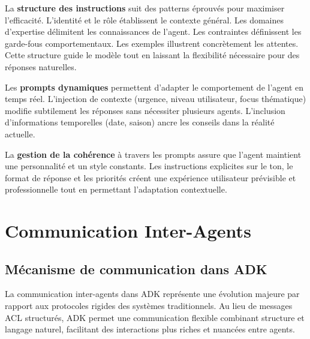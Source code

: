 La \textbf{structure des instructions} suit des patterns éprouvés pour maximiser l'efficacité. L'identité et le rôle établissent le contexte général. Les domaines d'expertise délimitent les connaissances de l'agent. Les contraintes définissent les garde-fous comportementaux. Les exemples illustrent concrètement les attentes. Cette structure guide le modèle tout en laissant la flexibilité nécessaire pour des réponses naturelles.

Les \textbf{prompts dynamiques} permettent d'adapter le comportement de l'agent en temps réel. L'injection de contexte (urgence, niveau utilisateur, focus thématique) modifie subtilement les réponses sans nécessiter plusieurs agents. L'inclusion d'informations temporelles (date, saison) ancre les conseils dans la réalité actuelle.

La \textbf{gestion de la cohérence} à travers les prompts assure que l'agent maintient une personnalité et un style constants. Les instructions explicites sur le ton, le format de réponse et les priorités créent une expérience utilisateur prévisible et professionnelle tout en permettant l'adaptation contextuelle.

\section{Communication Inter-Agents}

\subsection{Mécanisme de communication dans ADK}

La communication inter-agents dans ADK représente une évolution majeure par rapport aux protocoles rigides des systèmes traditionnels. Au lieu de messages ACL structurés, ADK permet une communication flexible combinant structure et langage naturel, facilitant des interactions plus riches et nuancées entre agents.

